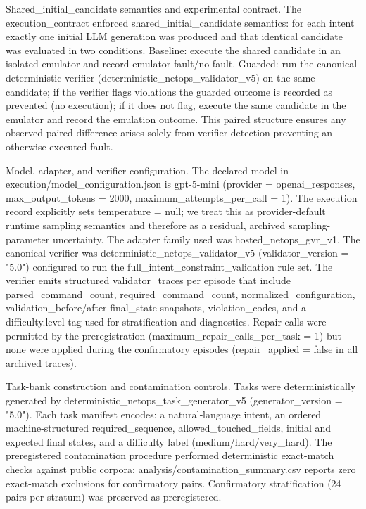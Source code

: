 \documentclass[conference]{IEEEtran}
\begin{document}
Shared\_initial\_candidate semantics and experimental contract. The execution\_contract enforced shared\_initial\_candidate semantics: for each intent exactly one initial LLM generation was produced and that identical candidate was evaluated in two conditions. Baseline: execute the shared candidate in an isolated emulator and record emulator fault/no-fault. Guarded: run the canonical deterministic verifier (deterministic\_netops\_validator\_v5) on the same candidate; if the verifier flags violations the guarded outcome is recorded as prevented (no execution); if it does not flag, execute the same candidate in the emulator and record the emulation outcome. This paired structure ensures any observed paired difference arises solely from verifier detection preventing an otherwise-executed fault.

Model, adapter, and verifier configuration. The declared model in execution/model\_configuration.json is gpt-5-mini (provider = openai\_responses, max\_output\_tokens = 2000, maximum\_attempts\_per\_call = 1). The execution record explicitly sets temperature = null; we treat this as provider-default runtime sampling semantics and therefore as a residual, archived sampling-parameter uncertainty. The adapter family used was hosted\_netops\_gvr\_v1. The canonical verifier was deterministic\_netops\_validator\_v5 (validator\_version = "5.0") configured to run the full\_intent\_constraint\_validation rule set. The verifier emits structured validator\_traces per episode that include parsed\_command\_count, required\_command\_count, normalized\_configuration, validation\_before/after final\_state snapshots, violation\_codes, and a difficulty.level tag used for stratification and diagnostics. Repair calls were permitted by the preregistration (maximum\_repair\_calls\_per\_task = 1) but none were applied during the confirmatory episodes (repair\_applied = false in all archived traces).

Task-bank construction and contamination controls. Tasks were deterministically generated by deterministic\_netops\_task\_generator\_v5 (generator\_version = "5.0"). Each task manifest encodes: a natural‑language intent, an ordered machine-structured required\_sequence, allowed\_touched\_fields, initial and expected final states, and a difficulty label (medium/hard/very\_hard). The preregistered contamination procedure performed deterministic exact-match checks against public corpora; analysis/contamination\_summary.csv reports zero exact-match exclusions for confirmatory pairs. Confirmatory stratification (24 pairs per stratum) was preserved as preregistered.
\end{document}
